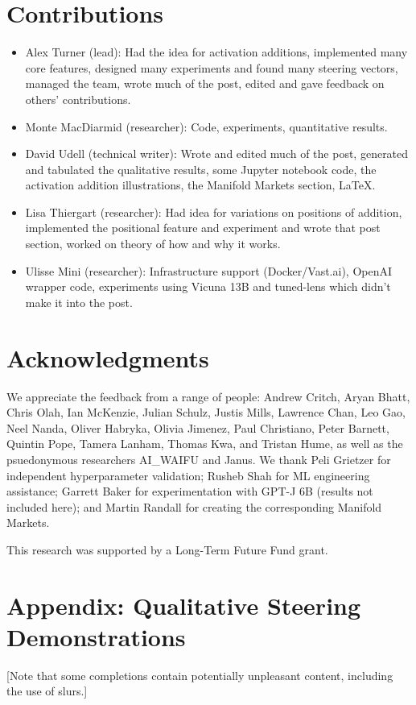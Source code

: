 \documentclass[10pt]{article}
\begin{document}
\section*{Contributions}
\begin{itemize}
\item Alex Turner (lead): Had the idea for activation additions, implemented many core features, designed many experiments and found many steering vectors, managed the team, wrote much of the post, edited and gave feedback on others' contributions. 
\item Monte MacDiarmid (researcher): Code, experiments, quantitative results.
\item David Udell (technical writer): Wrote and edited much of the post, generated and tabulated the qualitative results, some Jupyter notebook code, the activation addition illustrations, the Manifold Markets section, \LaTeX.
\item Lisa Thiergart (researcher): Had idea for variations on positions of addition, implemented the positional feature and experiment and wrote that post section, worked on theory of how and why it works.
\item Ulisse Mini (researcher): Infrastructure support (Docker/Vast.ai), OpenAI wrapper code, experiments using Vicuna 13B and tuned-lens which didn't make it into the post.
\end{itemize}


\section*{Acknowledgments}
We appreciate the feedback from a range of people: Andrew Critch, Aryan Bhatt, Chris Olah, Ian McKenzie, Julian Schulz, Justis Mills, Lawrence Chan, Leo Gao, Neel Nanda, Oliver Habryka, Olivia Jimenez, Paul Christiano, Peter Barnett, Quintin Pope, Tamera Lanham, Thomas Kwa, and Tristan Hume, as well as the psuedonymous researchers AI\_WAIFU and Janus. We thank Peli Grietzer for independent hyperparameter validation; Rusheb Shah for ML engineering assistance; Garrett Baker for experimentation with GPT-J 6B (results not included here); and Martin Randall for creating the corresponding Manifold Markets.

This research was supported by a Long-Term Future Fund grant.






\newpage
\appendix
\onecolumn
\section{Appendix: Qualitative Steering Demonstrations}
[Note that some completions contain potentially unpleasant content, including the use of slurs.]
\end{document}

